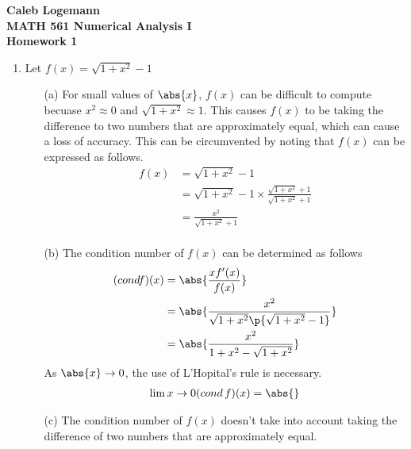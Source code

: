 \documentclass[11pt]{article}
\begin{document}
\noindent \textbf{\Large{Caleb Logemann \\
MATH 561 Numerical Analysis I \\
Homework 1
}}

\begin{enumerate}
    \item %
        Let $f(x) = \sqrt{1 + x^2} - 1$
        \begin{enumerate}
            \item[(a)]
                For small values of $\abs{x}$, $f(x)$ can be difficult to compute
                becuase $x^2 \approx 0$ and $\sqrt{1 + x^2} \approx 1$.
                This causes $f(x)$ to be taking the difference to two numbers
                that are approximately equal, which can cause a loss of accuracy.
                This can be circumvented by noting that $f(x)$ can be
                expressed as follows.
                \begin{align*}
                    f(x) &= \sqrt{1 + x^2} - 1 \\
                         &= \sqrt{1 + x^2} - 1 \times \frac{\sqrt{1 + x^2} + 1}{\sqrt{1 + x^2} + 1} \\
                         &= \frac{x^2}{\sqrt{1 + x^2} + 1} \\
                \end{align*}

            \item[(b)]
                The condition number of $f(x)$ can be determined as follows
                \begin{align*}
                    (cond f)(x) &= \abs{\frac{x f'(x)}{f(x)}} \\
                                &= \abs{\frac{x^2}{\sqrt{1+x^2}\p{\sqrt{1 + x^2} - 1}}} \\
                                &= \abs{\frac{x^2}{1 + x^2 - \sqrt{1 + x^2}}} \\
                \end{align*}
                As $\abs{x} \to 0$, the use of L'Hopital's rule is necessary.
                \begin{align*}
                    \lim{x \to 0}{(cond\, f)(x)} = \abs{}
                \end{align*}

            \item[(c)]
                The condition number of $f(x)$ doesn't take into account taking
                the difference of two numbers that are approximately equal.
        \end{enumerate}


\end{enumerate}
\end{document}
